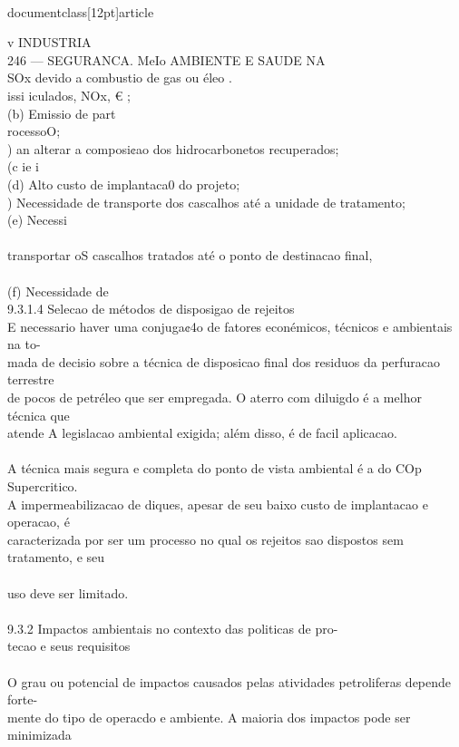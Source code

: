 \\documentclass[12pt]{article}
\begin{document}
{{{{v INDUSTRIA\\
246 — SEGURANCA. MeIo AMBIENTE E SAUDE NA\\
SOx devido a combustio de gas ou éleo .\\
issi iculados, NOx, € ;\\
(b) Emissio de part\\
rocessoO;\\
) an alterar a composi¢ao dos hidrocarbonetos recuperados;\\
(c ie i\\
(d) Alto custo de implantaca0 do projeto;\\
) Necessidade de transporte dos cascalhos até a unidade de tratamento;\\
(e) Necessi\\
\\
transportar oS cascalhos tratados até o ponto de destinacao final,\\
\\
(f) Necessidade de\\
9.3.1.4 Selecao de métodos de disposigao de rejeitos\\
E necessario haver uma conjuga¢4o de fatores econémicos, técnicos e ambientais na to-\\
mada de decisio sobre a técnica de disposicao final dos residuos da perfuracao terrestre\\
de pocos de petréleo que ser empregada. O aterro com diluigdo é a melhor técnica que\\
atende A legislacao ambiental exigida; além disso, é de facil aplicacao.\\
\\
A técnica mais segura e completa do ponto de vista ambiental é a do COp Supercritico.\\
A impermeabilizacao de diques, apesar de seu baixo custo de implantacao e operacao, é\\
caracterizada por ser um processo no qual os rejeitos sao dispostos sem tratamento, e seu\\
\\
uso deve ser limitado.\\
\\
9.3.2 Impactos ambientais no contexto das politicas de pro-\\
tecao e seus requisitos\\
\\
O grau ou potencial de impactos causados pelas atividades petroliferas depende forte-\\
mente do tipo de operacdo e ambiente. A maioria dos impactos pode ser minimizada\\
}}}}
\end{document}

